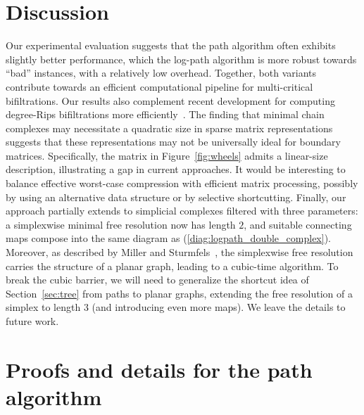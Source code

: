 \section{Discussion} 
\label{sec:conclusion}
%
Our experimental evaluation suggests that the path algorithm often exhibits slightly
better performance, which the log-path algorithm is more robust towards
``bad'' instances, with a relatively low overhead.
Together, both
variants contribute towards an efficient
computational pipeline for multi-critical bifiltrations.
Our results also complement recent development for computing degree-Rips
bifiltrations more efficiently~\cite{deg-rips-submission}.
The finding that minimal chain complexes may necessitate a quadratic size in sparse matrix representations suggests that these representations may not be universally ideal for boundary matrices.
Specifically, the matrix in Figure~\ref{fig:wheels} admits a linear-size description, illustrating a gap in current approaches.
It would be interesting to balance effective worst-case compression with efficient matrix processing, possibly by using an alternative data structure or by selective shortcutting.
%
Finally, our approach partially extends to simplicial complexes
filtered with three parameters: a simplexwise minimal free resolution now has length
$2$, and suitable connecting maps compose into the same diagram as 
(\ref{diag:logpath_double_complex}).
Moreover, as described by
Miller and Sturmfels~\cite{miller_sturmfels_book}, the simplexwise
free resolution carries the structure of a planar graph,
leading to a cubic-time algorithm. 
To break the cubic barrier, we will need to generalize the shortcut idea
of Section~\ref{sec:tree}
from paths to planar graphs, extending the free resolution of a simplex
to length $3$ (and introducing even more maps). We leave the details to future work.
%
\newpage
%
%
%
%
%
\newpage
%
%
\appendix
%
\section{Proofs and details for the path algorithm}
\label{app:path}
%
